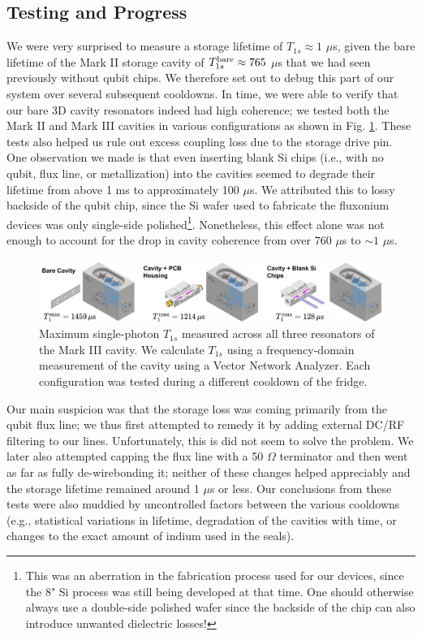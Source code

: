 \subsection{Testing and Progress}
We were very surprised to measure a storage lifetime of $T_{1s} \approx 1$ $\mu$s, given the bare lifetime of the Mark II storage cavity of $T_{1s}^{\rm bare} \approx 765$ $\mu$s that we had seen previously without qubit chips. We therefore set out to debug this part of our system over several subsequent cooldowns. In time, we were able to verify that our bare 3D cavity resonators indeed had high coherence; we tested both the Mark II and Mark III cavities in various configurations as shown in Fig. \ref{fig:4_3D_Cavity_Debugging}. These tests also helped us rule out excess coupling loss due to the storage drive pin. One observation we made is that even inserting blank Si chips (i.e., with no qubit, flux line, or metallization) into the cavities seemed to degrade their lifetime from above 1 ms to approximately 100 $\mu$s. We attributed this to lossy backside of the qubit chip, since the Si wafer used to fabricate the fluxonium devices was only single-side polished\footnote{This was an aberration in the fabrication process used for our devices, since the 8" Si process was still being developed at that time. One should otherwise always use a double-side polished wafer since the backside of the chip can also introduce unwanted dielectric losses!}. Nonetheless, this effect alone was not enough to account for the drop in cavity coherence from over 760 $\mu$s to $\sim\!1$ $\mu$s. 

\begin{figure}[t]
    \centering
    \includegraphics[width=\linewidth]{Figures/4/3D_Cavity_Debugging.pdf}
    \caption[Attempts to debug low storage lifetime in different configurations.]{Maximum single-photon $T_{1s}$ measured across all three resonators of the Mark III cavity. We calculate $T_{1s}$ using a frequency-domain measurement of the cavity using a Vector Network Analyzer. Each configuration was tested during a different cooldown of the fridge.}
    \label{fig:4_3D_Cavity_Debugging}
\end{figure}

Our main suspicion was that the storage loss was coming primarily from the qubit flux line; we thus first attempted to remedy it by adding external DC/RF filtering to our lines. Unfortunately, this is did not seem to solve the problem. We later also attempted capping the flux line with a 50 $\Omega$ terminator and then went as far as fully de-wirebonding it; neither of these changes helped appreciably and the storage lifetime remained around 1 $\mu$s or less. Our conclusions from these tests were also muddied by uncontrolled factors between the various cooldowns (e.g., statistical variations in lifetime, degradation of the cavities with time, or changes to the exact amount of indium used in the seals). 

